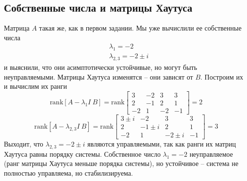 \documentclass[a4paper, 12pt]{article}
\begin{document}
    \subsection{Собственные числа и матрицы Хаутуса}
    Матрица $A$ такая же, как в первом задании. Мы уже вычислили ее собственные числа
    \begin{align*}
        &\lambda_1=-2\\
        &\lambda_{2,3}=-2\pm i
    \end{align*}
    и выяснили, что они асимптотически устойчивые, но могут быть неуправляемыми.
    Матрицы Хаутуса изменятся -- они зависят от $B$. Построим их и вычислим их ранги
    $$
    \text{rank}\left[A-\lambda_1 I\ B\right]=\text{rank}\begin{bmatrix}
        3 &-2 &3 &3\\
        2 &-1 &2 &1\\
        -2 &1 &-2 &-1
    \end{bmatrix}=2
    $$
    $$
    \text{rank}\left[A-\lambda_{2,3} I\ B\right]=\text{rank}\begin{bmatrix}
        3\pm i &-2 &3 &3\\
        2 &-1\pm i &2 &1\\
        -2 &1 &-2\pm i &-1
    \end{bmatrix}=3
    $$
    Выходит, что $\lambda_{2,3}=-2\pm i$ являются управляемыми, так как ранги их матриц Хаутуса равны порядку системы.
    Собственное число $\lambda_1=-2$ неуправляемое (ранг матрицы Хаутуса меньше порядка системы), но устойчивое -- система не полностью управляема, но стабилизируема.
\end{document}
